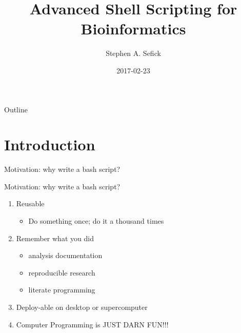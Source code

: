 \documentclass[t,10pt]{beamer}
\author{Stephen A. Sefick}
\date{2017-02-23}
\title{Advanced Shell Scripting for Bioinformatics}
\begin{document}
\maketitle
\begin{frame}{Outline}
\tableofcontents
\end{frame}



\section{Introduction}
\label{sec:orgheadline16}
\begin{frame}[label={sec:orgheadline1}]{Motivation: why write a bash script?}
\end{frame}
\begin{frame}[label={sec:orgheadline2}]{Motivation: why write a bash script?}
\begin{enumerate}[<+->]
\item Reusable 
\begin{itemize}
\item Do something once; do it a thousand times \vspace{0.25in}
\end{itemize}
\item Remember what you did
\begin{itemize}
\item analysis documentation
\item reproducible research
\item literate programming \vspace{0.25in}
\end{itemize}
\item Deploy-able on desktop or supercomputer \vspace{0.25in}
\item Computer Programming is JUST DARN FUN!!!
\end{enumerate}
\end{frame}
\end{document}
